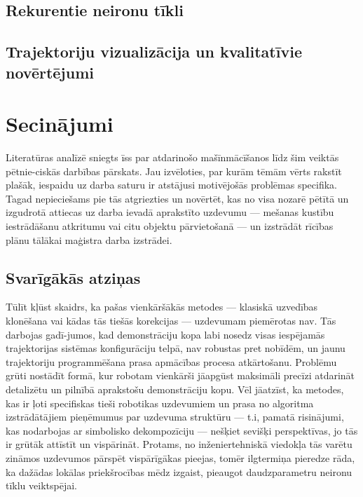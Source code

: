 \documentclass[12pt, a4paper]{article}
\numberwithin{equation}{section} %
\begin{document}
\subsection{Rekurentie neironu tīkli}

\subsection{Trajektoriju vizualizācija un kvalitatīvie novērtējumi}


%
%
%
%
%
%
%
%
%
%
%
%
%
%
%
%
%
%
%

\newpage
\section{Secinājumi}

Literatūras analīzē sniegts īss par atdarinošo mašīnmācīšanos līdz šim veiktās pētnie-ciskās darbības pārskats. Jau izvēloties, par kurām tēmām vērts rakstīt plašāk, iespaidu uz darba saturu ir atstājusi motivējošās problēmas specifika. Tagad nepieciešams pie tās atgriezties un novērtēt, kas no visa nozarē pētītā un izgudrotā attiecas uz darba ievadā aprakstīto uzdevumu --- mešanas kustību iestrādāšanu atkritumu vai citu objektu pārvietošanā --- un izstrādāt rīcības plānu tālākai maģistra darba izstrādei.

\subsection{Svarīgākās atziņas}

Tūlīt kļūst skaidrs, ka pašas vienkāršākās metodes --- klasiskā uzvedības klonēšana \cite{pomerleau1989alvinn} vai kādas tās tiešās korekcijas --- uzdevumam piemērotas nav. Tās darbojas gadī-jumos, kad demonstrāciju kopa labi nosedz visas iespējamās trajektorijas sistēmas konfigurāciju telpā, nav robustas pret nobīdēm, un jaunu trajektoriju programmēšana prasa apmācības procesa atkārtošanu. Problēmu grūti nostādīt formā, kur robotam vienkārši jāapgūst maksimāli precīzi atdarināt detalizētu un pilnībā aprakstošu demonstrāciju kopu. Vēl jāatzīst, ka metodes, kas ir ļoti specifiskas tieši robotikas uzdevumiem un prasa no algoritma izstrādātājiem pieņēmumus par uzdevuma struktūru --- t.i, pamatā risinājumi, kas nodarbojas ar simbolisko dekompozīciju \cite{ijspeert2002movement,schaal2003computational, wang2020framework,pastor2011online,pastor2011skill} --- nešķiet sevišķi perspektīvas, jo tās ir grūtāk attīstīt un vispārināt. Protams, no inženiertehniskā viedokļa tās varētu zināmos uzdevumos pārspēt vispārīgākas pieejas, tomēr ilgtermiņa pieredze rāda, ka dažādas lokālas priekšrocības mēdz izgaist, pieaugot daudzparametru neironu tīklu veiktspējai.
\end{document}
